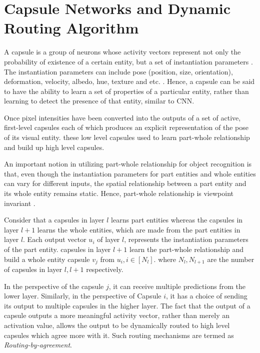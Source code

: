 \section{Capsule Networks and Dynamic Routing Algorithm}
\label{sect:related_caps}
A capsule is a group of neurons whose activity vectors represent not only the probability of existence of a certain entity, but a set of instantiation parameters \cite{hinton2011transforming}. The instantiation parameters can include pose (position, size, orientation), deformation, velocity, albedo, hue, texture and etc. \cite{sabour2017dynamic}. Hence, a capsule can be said to have the ability to learn a set of properties of a particular entity, rather than learning to detect the presence of that entity, similar to CNN. 

Once pixel intensities have been converted into the outputs of a set of active, first-level capsules each of which produces an explicit representation of the pose of its visual entity. these low level capsules used to learn part-whole relationship and build up high level capsules.

An important notion in utilizing part-whole relationship for object recognition is that, even though the instantiation parameters for part entities and whole entities can vary for different inputs, the spatial relationship between a part entity and its whole entity remains static. Hence, part-whole relationship is viewpoint invariant \cite{hinton2011transforming}.

Consider that a capsules in layer $l$ learns part entities whereas the capsules in layer $l+1$ learns the whole entities, which are made from the part entities in layer $l$. Each output vector $u_i$ of layer $l$, represents the instantiation parameters of the part entity. capsules in layer $l+1$ learn the part-whole relationship and build a whole entity capsule $v_j$ from $u_i, i \in [N_l]$. where $N_l, N_{l+1}$ are the number of capsules in layer $l, l+1$ respectively.


In the perspective of the capsule $j$, it can receive multiple predictions from the lower layer. Similarly, in the perspective of Capsule $i$, it has a choice of sending its output to multiple capsules in the higher layer. The fact that the output of a capsule outputs a more meaningful activity vector, rather than merely an activation value, allows the output to be dynamically routed to high level capsules which agree more with it. Such routing mechanisms are termed as \textit{Routing-by-agreement}.

